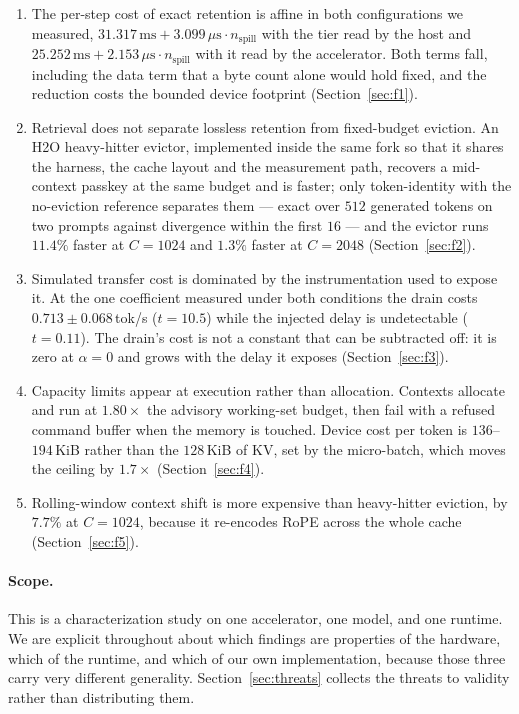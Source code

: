 \documentclass[manuscript,anonymous,review]{acmart}
\begin{document}
\begin{enumerate}
  \item The per-step cost of exact retention is affine in both
    configurations we measured, $31.317\,\text{ms} + 3.099\,\mu\text{s}
    \cdot n_\text{spill}$ with the tier read by the host and
    $25.252\,\text{ms} + 2.153\,\mu\text{s} \cdot n_\text{spill}$ with
    it read by the accelerator. Both terms fall, including the data
    term that a byte count alone would hold fixed, and the reduction
    costs the bounded device footprint (Section~\ref{sec:f1}).
  \item Retrieval does not separate lossless retention from
    fixed-budget eviction. An H2O heavy-hitter evictor, implemented
    inside the same fork so that it shares the harness, the cache
    layout and the measurement path, recovers a
    mid-context passkey at the same budget and is faster; only
    token-identity with the no-eviction reference separates them ---
    exact over $512$ generated tokens on two prompts against divergence
    within the first $16$ --- and the evictor runs $11.4\%$ faster at
    $C = 1024$ and $1.3\%$ faster at $C = 2048$ (Section~\ref{sec:f2}).
  \item Simulated transfer cost is dominated by the instrumentation
    used to expose it. At the one coefficient measured under both
    conditions the drain costs $0.713 \pm 0.068$\,tok/s ($t = 10.5$)
    while the injected delay is undetectable ($t = 0.11$). The drain's
    cost is not a constant that can be subtracted off: it is zero at
    $\alpha = 0$ and grows with the delay it exposes
    (Section~\ref{sec:f3}).
  \item Capacity limits appear at execution rather than allocation.
    Contexts allocate and run at $1.80\times$ the advisory working-set
    budget, then fail with a refused command buffer when the memory is
    touched. Device cost per token is $136$--$194$\,KiB rather than the
    $128$\,KiB of KV, set by the micro-batch, which moves the ceiling
    by $1.7\times$ (Section~\ref{sec:f4}).
  \item Rolling-window context shift is more expensive than
    heavy-hitter eviction, by $7.7\%$ at $C = 1024$, because it
    re-encodes RoPE across the whole cache
    (Section~\ref{sec:f5}).
\end{enumerate}

\paragraph{Scope.} This is a characterization study on one accelerator,
one model, and one runtime. We are explicit throughout about which
findings are properties of the hardware, which of the runtime, and
which of our own implementation, because those three carry very
different generality. Section~\ref{sec:threats} collects the threats to
validity rather than distributing them.
\end{document}
